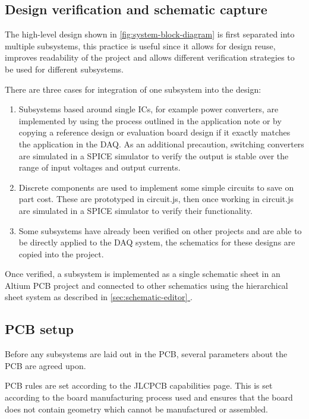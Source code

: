 \documentclass{report}
\newcommand*{\fullref}[1]{\hyperref[{#1}]{\ref*{#1} \nameref*{#1}}}
\begin{document}

\subsection{Design verification and schematic capture}

The high-level design shown in \ref{fig:system-block-diagram} is first separated into multiple subsystems, this practice is useful since it allows for design reuse, improves readability of the project and allows different verification strategies to be used for different subsystems.

There are three cases for integration of one subsystem into the design:

\begin{enumerate}
  \item Subsystems based around single ICs, for example power converters, are implemented by using the process outlined in the  application note or by copying a reference design or evaluation board design if it exactly matches the application in the DAQ. As an additional precaution, switching converters are simulated in a SPICE simulator to verify the output is stable over the range of input voltages and output currents.
  \item Discrete components are used to implement some simple circuits to save on part cost. These are prototyped in circuit.js, then once working in circuit.js are simulated in a SPICE simulator to verify their functionality.
  \item Some subsystems have already been verified on other projects and are able to be directly applied to the DAQ system, the schematics for these designs are copied into the project.
\end{enumerate}

Once verified, a subsystem is implemented as a single schematic sheet in an Altium PCB project and connected to other schematics using the hierarchical sheet system as described in \fullref{sec:schematic-editor}.

\subsection{PCB setup}

Before any subsystems are laid out in the PCB, several parameters about the PCB are agreed upon.

PCB rules are set according to the JLCPCB capabilities page. This is set according to the board manufacturing process used and ensures that the board does not contain geometry which cannot be manufactured or assembled.
\end{document}
